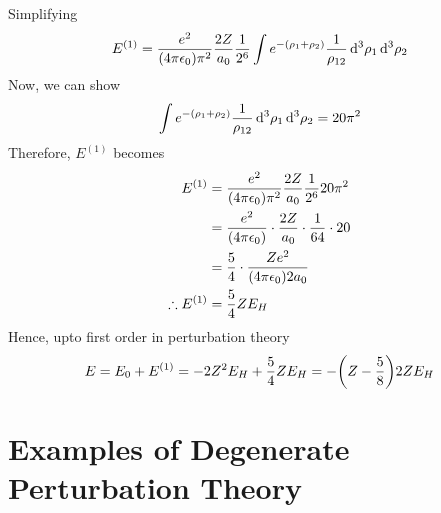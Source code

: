 \begin{enumerate}[label=Problem.\arabic*,start=1]
			Simplifying
			\begin{align*}
				E^{(1)} = \frac{e^2}{\qty(4 \pi \epsilon_0) \pi^2} \frac{2 Z}{a_0} \frac{1}{2^6} \int e^{-\qty(\rho_1 + \rho_2)} \frac{1}{\rho_{1 2}}  \dd[3]{\rho_1} \dd[3]{\rho_2}
			\end{align*}
			Now, we can show
			\begin{equation*}
				\int e^{-\qty(\rho_1 + \rho_2)} \frac{1}{\rho_{1 2}}  \dd[3]{\rho_1} \dd[3]{\rho_2} = 20 \pi^2
			\end{equation*}
			Therefore, $E^{(1)}$ becomes
			\begin{align*}
				E^{(1)} 
				&= \frac{e^2}{\qty(4 \pi \epsilon_0) \pi^2} \frac{2 Z}{a_0} \frac{1}{2^6} 20 \pi^2 \\
				&= \frac{e^2}{\qty(4 \pi \epsilon_0)} \cdot \frac{2 Z}{ a_0} \cdot \frac{1}{64} \cdot 20 \\
				&= \frac{5}{4} \cdot \frac{Z e^2}{\qty(4 \pi \epsilon_0) 2 a_0} \\
			\therefore E^{(1)}	&= \frac{5}{4} Z E_H
			\end{align*}
			Hence, upto first order in perturbation theory
			\begin{equation*}
				E = E_0 + E^{(1)} = - 2 Z^2 E_H + \frac{5}{4} Z E_H = - \qty(Z - \frac{5}{8}) 2 Z E_H
			\end{equation*}
			
			
			
			
			
		\end{enumerate}
	
	\section{Examples of Degenerate Perturbation Theory}
